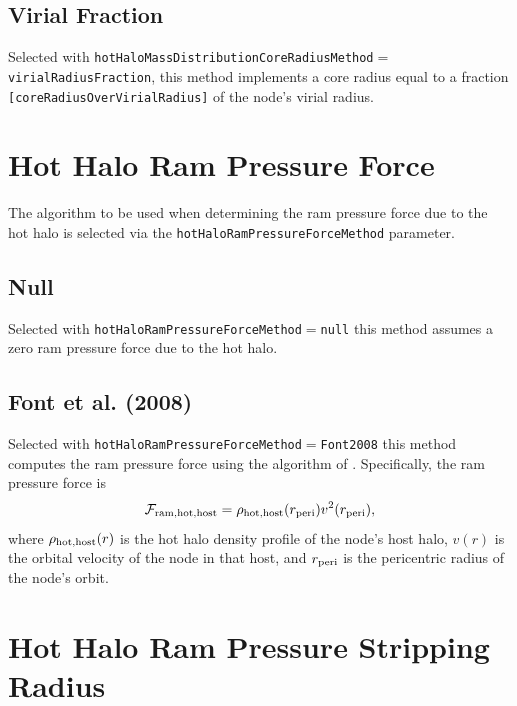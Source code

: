 \subsection{Virial Fraction}\label{phys:hotHaloMassDistributionCoreRadius:hotHaloMassDistributionCoreRadiusVirialFraction}

Selected with {\tt hotHaloMassDistributionCoreRadiusMethod}$=${\tt virialRadiusFraction}, this method implements a core radius equal to a fraction {\tt [coreRadiusOverVirialRadius]} of the node's virial radius.

\section{Hot Halo Ram Pressure Force}\label{sec:HotHaloRamPressureForce}

The algorithm to be used when determining the ram pressure force due to the hot halo is selected via the {\tt hotHaloRamPressureForceMethod} parameter.

\subsection{Null}

Selected with {\tt hotHaloRamPressureForceMethod}$=${\tt null} this method assumes a zero ram pressure force due to the hot halo.

\subsection{Font et al. (2008)}

Selected with {\tt hotHaloRamPressureForceMethod}$=${\tt Font2008} this method computes the ram pressure force using the algorithm of \cite{font_colours_2008}. Specifically, the ram pressure force is
\begin{equation}
\mathcal{F}_{\rm ram, hot, host} = \rho_{\rm hot, host}(r_{\rm peri}) v^2(r_{\rm peri}),
\end{equation}
where $\rho_{\rm hot, host}(r)$ is the hot halo density profile of the node's host halo, $v(r)$ is the orbital velocity of the node in that host, and $r_{\rm peri}$ is the pericentric radius of the node's orbit.

\section{Hot Halo Ram Pressure Stripping Radius}\label{sec:HotHaloRamPressureStrip}

